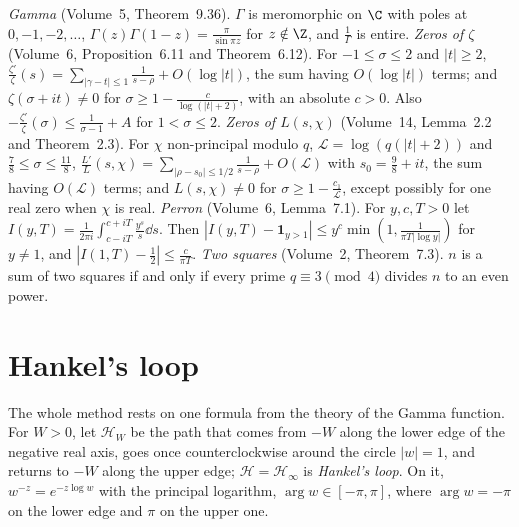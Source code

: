 \begin{reminder}
\emph{Gamma} (Volume~5, Theorem~9.36). $\Gamma$ is meromorphic on $\C$ with poles at $0,-1,-2,\dots$, $\Gamma(z)\Gamma(1-z)=\frac\pi{\sin\pi z}$ for $z\notin\Z$, and $\frac1\Gamma$ is entire.
\emph{Zeros of $\zeta$} (Volume~6, Proposition~6.11 and Theorem~6.12). For $-1\le\sigma\le2$ and $|t|\ge2$, $\frac{\zeta'}\zeta(s)=\sum_{|\gamma-t|\le1}\frac1{s-\rho}+O(\log|t|)$, the sum having $O(\log|t|)$ terms; and $\zeta(\sigma+it)\ne0$ for $\sigma\ge1-\frac c{\log(|t|+2)}$, with an absolute $c>0$. Also $-\frac{\zeta'}\zeta(\sigma)\le\frac1{\sigma-1}+A$ for $1<\sigma\le2$.
\emph{Zeros of $L(s,\chi)$} (Volume~14, Lemma~2.2 and Theorem~2.3). For $\chi$ non-principal modulo $q$, $\mathcal L=\log(q(|t|+2))$ and $\frac78\le\sigma\le\frac{11}8$, $\frac{L'}L(s,\chi)=\sum_{|\rho-s_0|\le1/2}\frac1{s-\rho}+O(\mathcal L)$ with $s_0=\frac98+it$, the sum having $O(\mathcal L)$ terms; and $L(s,\chi)\ne0$ for $\sigma\ge1-\frac{c_1}{\mathcal L}$, except possibly for one real zero when $\chi$ is real.
\emph{Perron} (Volume~6, Lemma~7.1). For $y,c,T>0$ let $I(y,T)=\frac1{2\pi i}\int_{c-iT}^{c+iT}\frac{y^s}s\dd s$. Then $|I(y,T)-\mathbf 1_{y>1}|\le y^c\min(1,\frac1{\pi T|\log y|})$ for $y\ne1$, and $|I(1,T)-\frac12|\le\frac c{\pi T}$.
\emph{Two squares} (Volume~2, Theorem~7.3). $n$ is a sum of two squares if and only if every prime $q\equiv3\pmod4$ divides $n$ to an even power.
\end{reminder}

\section{Hankel's loop}

The whole method rests on one formula from the theory of the Gamma function. For $W>0$, let $\mathcal H_W$ be the path that comes from $-W$ along the lower edge of the negative real axis, goes once counterclockwise around the circle $|w|=1$, and returns to $-W$ along the upper edge; $\mathcal H=\mathcal H_\infty$ is \emph{Hankel's loop}. On it, $w^{-z}=e^{-z\log w}$ with the principal logarithm, $\arg w\in[-\pi,\pi]$, where $\arg w=-\pi$ on the lower edge and $\pi$ on the upper one.

